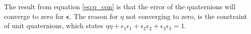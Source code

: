 The result from equation \eqref{eq:q_con} is that the error of the quaternions will converge to zero for $\boldsymbol{\epsilon}$. The reason for $\eta$ not converging to zero, is the constraint of unit quaternions, which states $\eta \eta + \epsilon_1 \epsilon_1 + \epsilon_2 \epsilon_2 + \epsilon_3 \epsilon_3 = 1$. 





